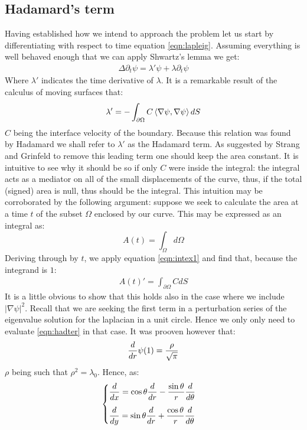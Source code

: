 \documentclass[../main.tex]{subfiles}
\begin{document}
	\subsection{Hadamard's term}
		Having established how we intend to approach the problem let us start by differentiating with respect to time equation \ref{eqn:lapleig}. Assuming everything is well behaved enough that we can apply Shwartz's lemma we get:
		\begin{gather}
			\Delta\partial_{t}\psi=\lambda'\psi+\lambda\partial_{t}\psi
		\end{gather}
		Where $ \lambda' $ indicates the time derivative of $ \lambda $. It is a remarkable result of the calculus of moving surfaces that:
		\begin{gather}
			\label{eqn:hadter}
			\lambda'=-\int_{\partial\Omega}C\left<\nabla\psi,\nabla\psi\right>dS
		\end{gather}
		$ C $ being the interface velocity of the boundary. Because this relation was found by Hadamard we shall refer to $ \lambda' $ as the Hadamard term. As suggested by Strang and Grinfeld to remove this leading term one should keep the area constant. It is intuitive to see why it should be so if only $ C $ were inside the integral: the integral acts as a mediator on all of the small displacements of the curve, thus, if the total (signed) area is null, thus should be the integral. This intuition may be corroborated by the following argument: suppose we seek to calculate the area at a time $ t $ of the subset $ \Omega $ enclosed by our curve. This may be expressed as an integral as:
		\begin{equation}
			A(t)=\int_{\Omega}d\Omega
		\end{equation}
		Deriving through by $ t $, we apply equation \ref{eqn:intex1} and find that, because the integrand is $ 1 $:
		\begin{gather}
			A(t)'=\int_{\partial\Omega}CdS
		\end{gather}
		It is a little obvious to show that this holds also in the case where we include $ \left|\nabla\psi\right|^{2} $. Recall that we are seeking the first term in a perturbation series of the eigenvalue solution for the laplacian in a unit circle. Hence we only only need to evaluate \ref{eqn:hadter} in that case. It was prooven however that:
		\begin{gather}
		\dfrac{d}{dr}\psi(1)=\dfrac{\rho}{\sqrt{\pi}}
		\end{gather}
		$ \rho $ being such that $ \rho^{2}=\lambda_{0} $. Hence, as:
		\begin{gather}
			\begin{cases}
			\der{}{x}=\cos\theta\der{}{r}-\dfrac{\sin\theta}{r}\der{}{\theta}			\vspace{3mm}\\
			\der{}{y}=\sin\theta\der{}{r}+\dfrac{\cos\theta}{r}\der{}{\theta}
			\end{cases}
		\end{gather}
\end{document}
